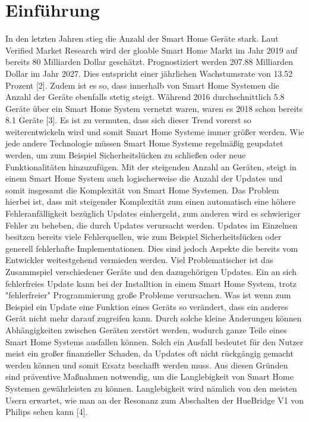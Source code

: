\chapter{Einführung}

In den letzten Jahren stieg die Anzahl der Smart Home Geräte stark. Laut Verified Market Research wird
der gloable Smart Home Markt im Jahr 2019 auf bereits 80 Milliarden Dollar geschätzt. Prognostiziert werden 207.88 
Milliarden Dollar im Jahr 2027. Dies entspricht einer jährlichen Wachstumsrate von 13.52 Prozent [2].
Zudem ist es so, dass innerhalb von Smart Home Systemen die Anzahl der Geräte ebenfalls stetig steigt. Während 2016
durchschnittlich 5.8 Geräte über ein Smart Home System vernetzt waren, waren es 2018 schon bereits 8.1 Geräte [3]. 
Es ist zu vermuten, dass sich dieser Trend vorerst so weiterentwickeln wird und somit Smart Home Systeme immer
größer werden. Wie jede andere Technologie müssen Smart Home Systeme regelmäßig geupdatet werden, um zum Beispiel
Sicherheitslücken zu schließen oder neue Funktionalitäten hinzuzufügen. 
Mit der steigenden Anzahl an Geräten, steigt in einem Smart Home System auch logischerweise die Anzahl der Updates und somit 
insgesamt die Komplexität von Smart Home Systemen. Das Problem hierbei ist, dass mit steigender Komplexität zum einen automatisch eine höhere
Fehleranfälligkeit bezüglich Updates einhergeht, zum anderen wird es schwieriger Fehler zu beheben,
die durch Updates verursacht werden. Updates im Einzelnen besitzen bereits viele Fehlerquellen, wie zum Beispiel Sicherheitslücken 
oder generell fehlerhafte Implementationen. Dies sind jedoch Aspekte die bereits vom Entwickler weitestgehend vermieden werden.
Viel Problematischer ist das Zusammspiel verschiedener Geräte und den dazugehörigen Updates. Ein an sich fehlerfreies Update
kann bei der Installtion in einem Smart Home System, trotz "fehlerfreier" Programmierung große Probleme verursachen. Was ist wenn zum Beispiel 
ein Update eine Funktion eines Geräts so verändert, dass ein anderes Gerät nicht mehr darauf zugreifen kann. Durch solche kleine Änderungen
können Abhängigkeiten zwischen Geräten zerstört werden, wodurch ganze Teile eines Smart Home Systems ausfallen
können. Solch ein Ausfall bedeutet für den Nutzer meist ein großer finanzieller Schaden, da Updates oft nicht 
rückgängig gemacht werden können und somit Ersatz beschafft werden muss.
Aus diesen Gründen sind präventive Maßnahmen notwendig,  um die Langlebigkeit von Smart Home Systemen gewährleisten zu können.
Langlebigkeit wird nämlich von den meisten Usern erwartet, wie man an der Resonanz zum Abschalten der HueBridge V1 von Philips sehen kann 
[4].


